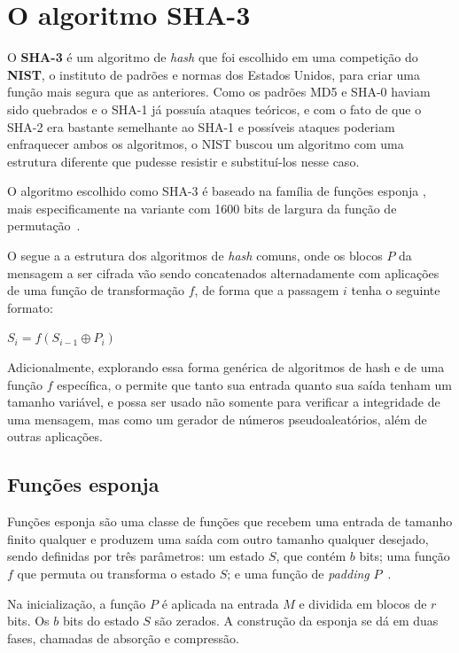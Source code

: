 \section{O algoritmo SHA-3}

O \textbf{SHA-3} é um algoritmo de \textit{hash} que foi escolhido em uma
competição do \textbf{NIST}, o instituto de padrões e normas dos Estados
Unidos, para criar uma função mais segura que as anteriores. Como os padrões
MD5 e SHA-0 haviam sido quebrados e o SHA-1 já possuía ataques teóricos, e com
o fato de que o SHA-2 era bastante semelhante ao SHA-1 e possíveis ataques
poderiam enfraquecer ambos os algoritmos, o NIST buscou um algoritmo com uma
estrutura diferente que pudesse resistir e substituí-los nesse caso.

O algoritmo escolhido como SHA-3 é baseado na família de funções esponja
\textbf{\Keccak}, mais especificamente na variante com 1600 bits de largura da
função de permutação~\cite{fips:2015}.

O \Keccak{} segue a a estrutura dos algoritmos de \textit{hash} comuns, onde os
blocos $P$ da mensagem a ser cifrada vão sendo concatenados alternadamente com
aplicações de uma função de transformação $f$, de forma que a passagem $i$
tenha o seguinte formato:

\begin{center}
        $S_{i} = f(S_{i-1} \oplus P_{i})$
\end{center}

Adicionalmente, explorando essa forma genérica de algoritmos de hash e de uma
função $f$ específica, o \Keccak{} permite que tanto sua entrada quanto sua saída
tenham um tamanho variável, e possa ser usado não somente para verificar a
integridade de uma mensagem, mas como um gerador de números pseudoaleatórios,
além de outras aplicações.

\subsection{Funções esponja}

Funções esponja são uma classe de funções que recebem uma entrada de tamanho
finito qualquer e produzem uma saída com outro tamanho qualquer desejado, sendo
definidas por três parâmetros: um estado $S$, que contém $b$ bits; uma função
$f$ que permuta ou transforma o estado $S$; e uma função de \textit{padding}
$P$~\cite{noekeon:2011}.

Na inicialização, a função $P$ é aplicada na entrada $M$ e dividida em blocos
de $r$ bits. Os $b$ bits do estado $S$ são zerados. A construção da esponja se
dá em duas fases, chamadas de absorção e compressão.

